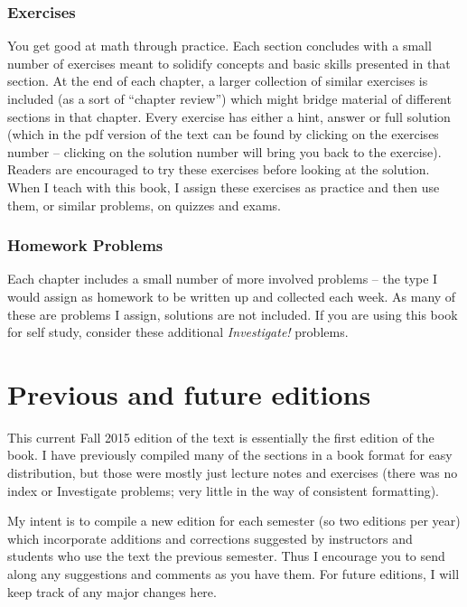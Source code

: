\subsubsection*{Exercises}

You get good at math through practice.  Each section concludes with a small number of exercises meant to solidify concepts and basic skills presented in that section.  At the end of each chapter, a larger collection of similar exercises is included (as a sort of ``chapter review'') which might bridge material of different sections in that chapter.  Every exercise has either a hint, answer or full solution (which in the pdf version of the text can be found by clicking on the exercises number -- clicking on the solution number will bring you back to the exercise).  Readers are encouraged to try these exercises before looking at the solution.  When I teach with this book, I assign these exercises as practice and then use them, or similar problems, on quizzes and exams.

\subsubsection*{Homework Problems} 

Each chapter includes a small number of more involved problems -- the type I would assign as homework to be written up and collected each week.  As many of these are problems I assign, solutions are not included.  If you are using this book for self study, consider these additional \emph{Investigate!} problems.


\section*{Previous and future editions}

This current Fall 2015 edition of the text is essentially the first edition of the book.  I have previously compiled many of the sections in a book format for easy distribution, but those were mostly just lecture notes and exercises (there was no index or Investigate problems; very little in the way of consistent formatting).

My intent is to compile a new edition for each semester (so two editions per year) which incorporate additions and corrections suggested by instructors and students who use the text the previous semester.  Thus I encourage you to send along any suggestions and comments as you have them.  For future editions, I will keep track of any major changes here.


